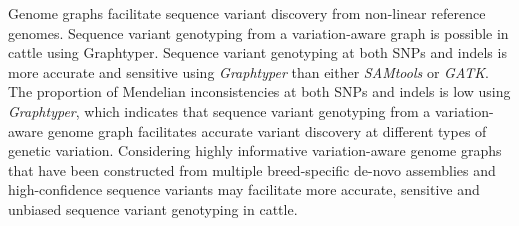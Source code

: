\documentclass[../main.tex]{subfiles}
\begin{document}
Genome graphs facilitate sequence variant discovery from non-linear reference genomes. Sequence variant genotyping from a variation-aware graph is possible in cattle using Graphtyper. Sequence variant genotyping at both SNPs and indels is more accurate and sensitive using \emph{Graphtyper} than either \emph{SAMtools} or \emph{GATK}. The proportion of Mendelian inconsistencies at both SNPs and indels is low using \emph{Graphtyper}, which indicates that sequence variant genotyping from a variation-aware genome graph facilitates accurate variant discovery at different types of genetic variation. Considering highly informative variation-aware genome graphs that have been constructed from multiple breed-specific de-novo assemblies and high-confidence sequence variants may facilitate more accurate, sensitive and unbiased sequence variant genotyping in cattle.

%


\singlespacing
\footnotesize




\ifdefined\BuildingFromMainFile
\else
   
\end{document}
